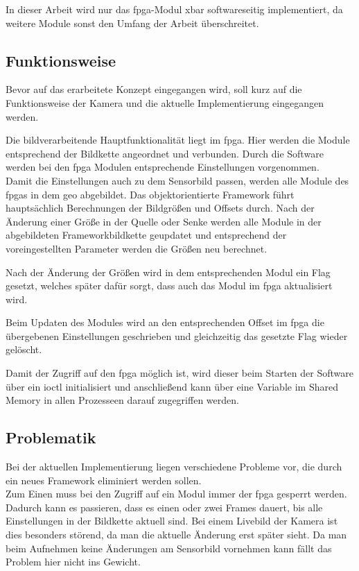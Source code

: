 In dieser Arbeit wird nur das \ac{fpga}-Modul \ac{xbar} softwareseitig implementiert, da weitere Module sonst den Umfang der Arbeit überschreitet. 


\subsection{Funktionsweise}
Bevor auf das erarbeitete Konzept eingegangen wird, soll kurz auf die Funktionsweise der Kamera und die aktuelle Implementierung eingegangen werden.

Die bildverarbeitende Hauptfunktionalität liegt im \ac{fpga}. Hier werden die Module entsprechend der Bildkette angeordnet und verbunden. Durch die Software werden bei den \ac{fpga} Modulen entsprechende Einstellungen vorgenommen.\\


Damit die Einstellungen auch zu dem Sensorbild passen, werden alle Module des \ac{fpga}s in dem \ac{geo} abgebildet. Das objektorientierte Framework führt hauptsächlich Berechnungen der Bildgrößen und Offsets durch. Nach der Änderung einer Größe in der Quelle oder Senke werden alle Module in der abgebildeten Frameworkbildkette geupdatet und entsprechend der voreingestellten Parameter werden die Größen neu berechnet. 

Nach der Änderung der Größen wird in dem entsprechenden Modul ein Flag gesetzt, welches später dafür sorgt, dass auch das Modul im \ac{fpga} aktualisiert wird. 

Beim Updaten des Modules wird an den entsprechenden Offset im \ac{fpga} die übergebenen Einstellungen geschrieben und gleichzeitig das gesetzte Flag wieder gelöscht. 

Damit der Zugriff auf den \ac{fpga} möglich ist, wird dieser beim Starten der Software über ein \ac{ioctl} initialisiert und anschließend kann über eine Variable im Shared Memory in allen Prozesseen darauf zugegriffen werden.

\subsection{Problematik}\label{sec:prob}
Bei der aktuellen Implementierung liegen verschiedene Probleme vor, die durch ein neues Framework eliminiert werden sollen.\\

Zum Einen muss bei den Zugriff auf ein Modul immer der \ac{fpga} gesperrt werden. Dadurch kann es passieren, dass es einen oder zwei Frames dauert, bis alle Einstellungen in der Bildkette aktuell sind. Bei einem Livebild der Kamera ist dies besonders störend, da man die aktuelle Änderung erst später sieht. Da man beim Aufnehmen keine Änderungen am Sensorbild vornehmen kann fällt das Problem hier nicht ins Gewicht.\\


